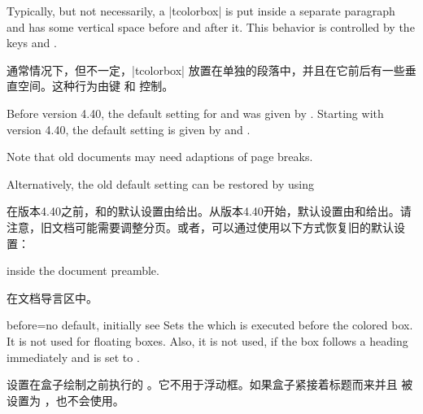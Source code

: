 Typically, but not necessarily, a |tcolorbox| is put inside a separate paragraph and has some vertical space before and after it.
This behavior is controlled by the keys  and .

通常情况下，但不一定，|tcolorbox| 放置在单独的段落中，并且在它前后有一些垂直空间。这种行为由键  和  控制。


\begin{marker}
Before version 4.40, the default setting for 
and  was given by .
Starting with version 4.40, the default setting is given by
 and .\par
Note that old documents may need adaptions of page breaks.\par
Alternatively, the old default setting can be restored by using


在版本4.40之前，和的默认设置由给出。从版本4.40开始，默认设置由和给出。请注意，旧文档可能需要调整分页。或者，可以通过使用以下方式恢复旧的默认设置：
\begin{dispListing}
\end{dispListing}
inside the document preamble.

在文档导言区中。
\end{marker}

\begin{docTcbKey}{before}{=}{no default, initially see }
Sets the  which is executed before the colored box.
It is not used for floating boxes.
Also, it is not used, if the box follows a heading immediately
and  is set to .

设置在盒子绘制之前执行的 。它不用于浮动框。如果盒子紧接着标题而来并且  被设置为 ，也不会使用。

\end{docTcbKey}

